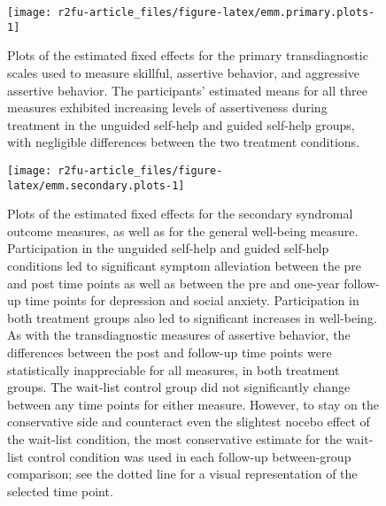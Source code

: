 \documentclass[3p]{elsarticle} %
\begin{document}
\begin{figure}
\texttt{[image: r2fu-article\_files/figure-latex/emm.primary.plots-1]} \caption{Plots of the estimated fixed effects for the primary transdiagnostic scales used to measure skillful, assertive behavior, and aggressive assertive behavior. The participants’ estimated means for all three measures exhibited increasing levels of assertiveness during treatment in the unguided self-help and guided self-help groups, with negligible differences between the two treatment conditions.}\label{fig:emm.primary.plots}
\end{figure}

\begin{figure}
\texttt{[image: r2fu-article\_files/figure-latex/emm.secondary.plots-1]} \caption{Plots of the estimated fixed effects for the secondary syndromal outcome measures, as well as for the general well-being measure. Participation in the unguided self-help and guided self-help conditions led to significant symptom alleviation between the pre and post time points as well as between the pre and one-year follow-up time points for depression and social anxiety. Participation in both treatment groups also led to significant increases in well-being. As with the transdiagnostic measures of assertive behavior, the differences between the post and follow-up time points were statistically inappreciable for all measures, in both treatment groups. The wait-list control group did not significantly change between any time points for either measure. However, to stay on the conservative side and counteract even the slightest nocebo effect of the wait-list condition, the most conservative estimate for the wait-list control condition was used in each follow-up between-group comparison; see the dotted line for a visual representation of the selected time point.}\label{fig:emm.secondary.plots}
\end{figure}
\end{document}
